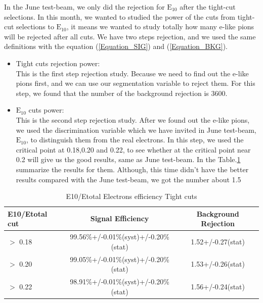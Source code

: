 In the June test-beam, we only did the rejection for $\mathrm{E_{10}}$ after the tight-cut selections. In this month, we wanted to studied the power of the cuts from tight-cut selections to $\mathrm{E_{10}}$, it means we wanted to study totally how many e-like pions will be rejected after all cuts.  We have two steps rejection, and we used the same definitions with the equation (\ref{Equation_SIG}) and (\ref{Equation_BKG}).
\begin{itemize}
\item Tight cuts rejection power: \\ 
This is the first step rejection study. Because we need to find out the e-like pions first, and we can use our segmentation variable to reject them.  For this step, we found that the number of the background rejection is 3600. 
\item $\mathrm{E_{10}}$ cuts power:\\
This is the second step rejection study. After we found out the e-like pions, we used the discrimination variable which we have invited in June test-beam,$\mathrm{E_{10}}$, to distinguish them from the real electrons. In this step, we used the critical point at 0.18,0.20 and 0.22, to see whether at the critical point near 0.2 will give us the good results, same as June test-beam. In the Table.\ref{basic_7} summarize the results for them. 
Although, this time didn't have the better results compared with the June test-beam, we got the number about 1.5
\end{itemize}
\begin{table}[h]%
    \centering
    \begin{tabular}{|l|c|c|}
    \hline
    E10/Etotal cut & Signal Efficiency & Background Rejection\\\hline
    $>$ 0.18 &  99.56\%+/-0.01\%(syst)+/-0.20\%(stat) &  1.52+/-0.27(stat)\\\hline  
    $>$ 0.20 &  99.05\%+/-0.01\%(syst)+/-0.20\%(stat) &  1.53+/-0.26(stat)\\\hline  
    $>$ 0.22 &  98.91\%+/-0.01\%(syst)+/-0.20\%(stat) &  1.56+/-0.24(stat)\\\hline  
        \end{tabular}
    \caption{E10/Etotal Electrons efficiency Tight cuts}\label{basic_7}  %
\end{table}

